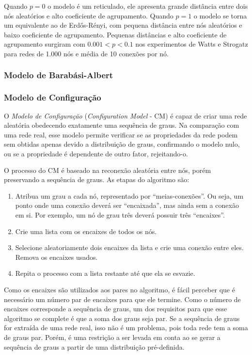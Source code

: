 \documentclass[12pt,a4paper]{article}
\theoremstyle{hypo}
\begin{document}
Quando $p = 0$ o modelo é um reticulado, ele apresenta grande distância entre dois nós aleatórios e alto coeficiente de agrupamento. Quando $p = 1$ o modelo se torna um equivalente ao de Erdős-Rényi, com pequena distância entre nós aleatórios e baixo coeficiente de agrupamento. Pequenas distâncias e alto coeficiente de agrupamento surgiram com $0.001 < p < 0.1$ nos experimentos de Watts e Strogatz para redes de 1.000 nós e média de 10 conexões por nó.

\subsubsection{Modelo de Barabási-Albert} \label{sec:modelo-barabasi-albert}

\subsubsection{Modelo de Configuração} \label{sec:modelo-configuracao}

O \textit{Modelo de Configuração} (\textit{Configuration Model} - CM) é capaz de criar uma rede aleatória obedecendo exatamente uma sequência de graus. Na comparação com uma rede real, esse modelo permite verificar se as propriedades da rede podem sem obtidas apenas devido a distribuição de graus, confirmando o modelo nulo, ou se a propriedade é dependente de outro fator, rejeitando-o.

O processo do CM é baseado na reconexão aleatória entre nós, porém preservando a sequência de graus. As etapas do algoritmo são:

\begin{enumerate}
\item Atribua um grau a cada nó, representado por \enquote{meias-conexões}. Ou seja, um ponto onde uma conexão deverá ser \enquote{encaixada}, mas ainda sem a conexão em si. Por exemplo, um nó de grau três deverá possuir três \enquote{encaixes}.
\item Crie uma lista com os encaixes de todos os nós.
\item Selecione aleatoriamente dois encaixes da lista e crie uma conexão entre eles. Remova os encaixes usados.
\item Repita o processo com a lista restante até que ela se esvazie.
\end{enumerate}

Como os encaixes são utilizados aos pares no algoritmo, é fácil perceber que é necessário um número par de encaixes para que ele termine. Como o número de encaixes corresponde a sequência de graus, um dos requisitos para que esse algoritmo se complete é que a soma dos graus seja par. Se a sequência de graus for extraída de uma rede real, isso não é um problema, pois toda rede tem a soma de graus par. Porém, é uma restrição a ser levada em conta ao se gerar a sequência de graus a partir de uma distribuição pré-definida.
\end{document}
